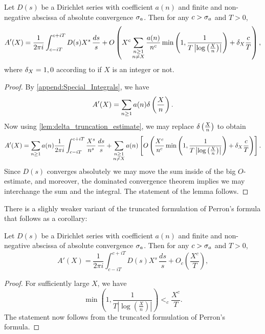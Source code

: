       \begin{theorem}
        Let $D(s)$ be a Dirichlet series with coefficient $a(n)$ and finite and non-negative abscissa of absolute convergence $\sigma_{a}$. Then for any $c > \sigma_{a}$ and $T > 0$,
        \[
          A'(X) = \frac{1}{2\pi i}\int_{c-iT}^{c+iT}D(s)X^{s}\,\frac{ds}{s}+O\left(X^{c}\sum_{\substack{n \ge 1 \\ n \neq X}}\frac{a(n)}{n^{c}}\min\left(1,\frac{1}{T\left|\log\left(\frac{X}{n}\right)\right|}\right)+\delta_{X}\frac{c}{T}\right),
        \]
        where $\delta_{X} = 1,0$ according to if $X$ is an integer or not.
      \end{theorem}
      \begin{proof}
        By \cref{append:Special_Integrals}, we have
        \[
          A'(X) = \sum_{n \ge 1}a(n)\delta\left(\frac{X}{n}\right).
        \]
        Now using \cref{lem:delta_truncation_estimate}, we may replace $\delta\left(\frac{X}{n}\right)$ to obtain
        \[
          A'(X) = \sum_{n \ge 1}a(n)\frac{1}{2\pi i}\int_{c-iT}^{c+iT}\frac{X^{s}}{n^{s}}\,\frac{ds}{s}+\sum_{\substack{n \ge 1 \\ n \neq X}}a(n)\left[O\left(\frac{X^{c}}{n^{c}}\min\left(1,\frac{1}{T\left|\log\left(\frac{X}{n}\right)\right|}\right)+\delta_{X}\frac{c}{T}\right)\right].
        \]
        Since $D(s)$ converges absolutely we may move the sum inside of the big $O$-estimate, and moreover, the dominated convergence theorem implies we may interchange the sum and the integral. The statement of the lemma follows.
      \end{proof}

      There is a slighly weaker variant of the truncated formulation of Perron's formula that follows as a corollary:

      \begin{corollary}
        Let $D(s)$ be a Dirichlet series with coefficient $a(n)$ and finite and non-negative abscissa of absolute convergence $\sigma_{a}$. Then for any $c > \sigma_{a}$ and $T > 0$,
        \[
          A'(X) = \frac{1}{2\pi i}\int_{c-iT}^{c+iT}D(s)X^{s}\,\frac{ds}{s}+O_{c}\left(\frac{X^{c}}{T}\right),
        \]
      \end{corollary}
      \begin{proof}
        For sufficiently large $X$, we have
        \[
          \min\left(1,\frac{1}{T\left|\log\left(\frac{X}{n}\right)\right|}\right) <_{c} \frac{X^{c}}{T}.
        \]
        The statement now follows from the truncated formulation of Perron's formula.
      \end{proof}


